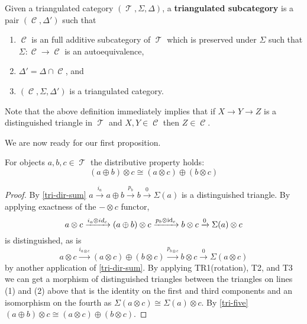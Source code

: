 \documentclass[11pt]{article}
\DeclareMathOperator{\CC}{\mathcal{C}}
\DeclareMathOperator{\TT}{\mathcal{T}}
\begin{document}
\begin{defn}
Given a triangulated category $(\TT,\Sigma,\Delta)$, a \textbf{triangulated subcategory} is a pair $(\CC,\Delta')$ such that
\begin{enumerate}[1.]
	\item $\CC$ is an full additive subcategory of $\TT$ which is preserved under $\Sigma$ such that $\Sigma: \CC \to \CC$ is an autoequivalence,
	\item $\Delta' = \Delta \cap \CC$, and
	\item $(\CC,\Sigma,\Delta')$ is a triangulated category.
\end{enumerate}
\end{defn}

\begin{rmk}
Note that the above definition immediately implies that if $X \to Y \to Z$ is a distinguished triangle in $\TT$ and $X,Y \in \CC$ then $Z \in \CC$.
\end{rmk}

We are now ready for our first proposition.

\begin{prop}
For objects $a,b,c \in \TT$ the distributive property holds:
\[
	(a \oplus b) \otimes c \cong (a \otimes c) \oplus (b \otimes c)
\]
\end{prop}
\begin{proof}\label{distribute}
By \autoref{tri-dir-sum} $a \xrightarrow{i_a} a \oplus b \xrightarrow{p_b} b \xrightarrow{0} \Sigma(a) $ is a distinguished triangle. By applying exactness of the $- \otimes c$ functor,
\begin{equation}
	a \otimes c \xrightarrow{i_a \otimes id_c} (a \oplus b) \otimes c \xrightarrow{p_b \otimes \operatorname{id}_c} b \otimes c \xrightarrow{ 0} \Sigma(a) \otimes c
\end{equation}
is distinguished, as is
\begin{equation}
	a \otimes c \xrightarrow{i_{a \otimes c}} (a \otimes c) \oplus (b \otimes c) \xrightarrow{p_{b \otimes c}} b \otimes c \xrightarrow{0} \Sigma(a \otimes c)
\end{equation}
by another application of \autoref{tri-dir-sum}. By applying TR1(rotation), T2, and T3 we can get a morphism of distinguished triangles between the triangles on lines (1) and (2) above that is the identity on the first and third components and an isomorphism on the fourth as $\Sigma(a \otimes c) \cong \Sigma(a) \otimes c$. By \autoref{tri-five} $(a \oplus b) \otimes c \cong (a \otimes c) \oplus (b \otimes c)$.
\end{proof}
\end{document}

